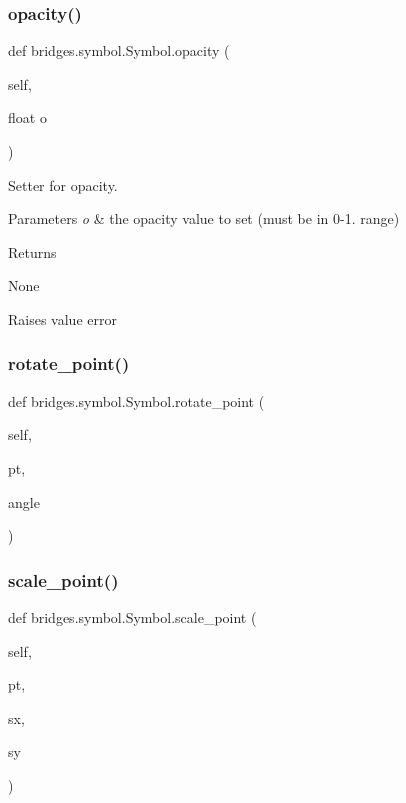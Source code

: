 \subsubsection{\texorpdfstring{opacity()}{opacity()}\hspace{0.1cm}{\footnotesize\ttfamily [2/2]}}
{\footnotesize\ttfamily def bridges.\+symbol.\+Symbol.\+opacity (\begin{DoxyParamCaption}\item[{}]{self,  }\item[{float}]{o }\end{DoxyParamCaption})}



Setter for opacity. 


\begin{DoxyParams}{Parameters}
{\em o} & the opacity value to set (must be in 0-\/1. range) \\
\hline
\end{DoxyParams}
\begin{DoxyReturn}{Returns}


None 

Raises value error 
\end{DoxyReturn}
\mbox{\label{classbridges_1_1symbol_1_1_symbol_a81d55230ba4fec6c9a31d76cfc97bc96}} 
\subsubsection{\texorpdfstring{rotate\_point()}{rotate\_point()}}
{\footnotesize\ttfamily def bridges.\+symbol.\+Symbol.\+rotate\+\_\+point (\begin{DoxyParamCaption}\item[{}]{self,  }\item[{}]{pt,  }\item[{}]{angle }\end{DoxyParamCaption})}

\mbox{\label{classbridges_1_1symbol_1_1_symbol_a963b55370096aa7314b03a2a34da2929}} 
\subsubsection{\texorpdfstring{scale\_point()}{scale\_point()}}
{\footnotesize\ttfamily def bridges.\+symbol.\+Symbol.\+scale\+\_\+point (\begin{DoxyParamCaption}\item[{}]{self,  }\item[{}]{pt,  }\item[{}]{sx,  }\item[{}]{sy }\end{DoxyParamCaption})}

